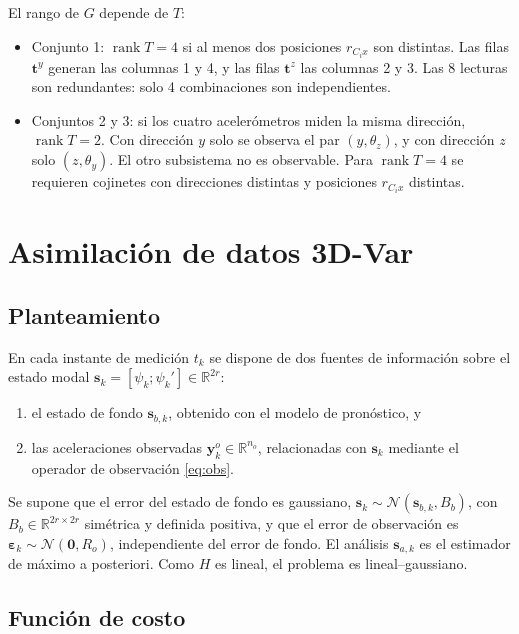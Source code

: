 El rango de $G$ depende de $T$:
\begin{itemize}
\item Conjunto 1: $\operatorname{rank}T=4$ si al menos dos posiciones $r_{C_ix}$ son distintas. Las filas $\mathbf t^y$ generan las columnas 1 y 4, y las filas $\mathbf t^z$ las columnas 2 y 3. Las 8 lecturas son redundantes: solo 4 combinaciones son independientes.
\item Conjuntos 2 y 3: si los cuatro acelerómetros miden la misma dirección, $\operatorname{rank}T=2$. Con dirección $y$ solo se observa el par $(y,\theta_z)$, y con dirección $z$ solo $(z,\theta_y)$. El otro subsistema no es observable. Para $\operatorname{rank}T=4$ se requieren cojinetes con direcciones distintas y posiciones $r_{C_ix}$ distintas.
\end{itemize}

\section{Asimilación de datos 3D-Var}

\subsection{Planteamiento}

En cada instante de medición $t_k$ se dispone de dos fuentes de información sobre el estado modal $\mathbf s_k=[\psi_k;\psi_k']\in\mathbb R^{2r}$:
\begin{enumerate}
\item el estado de fondo $\mathbf s_{b,k}$, obtenido con el modelo de pronóstico, y
\item las aceleraciones observadas $\mathbf y^o_k\in\mathbb R^{n_o}$, relacionadas con $\mathbf s_k$ mediante el operador de observación \eqref{eq:obs}.
\end{enumerate}
Se supone que el error del estado de fondo es gaussiano, $\mathbf s_k\sim\mathcal N(\mathbf s_{b,k},B_b)$, con $B_b\in\mathbb R^{2r\times2r}$ simétrica y definida positiva, y que el error de observación es $\boldsymbol\varepsilon_k\sim\mathcal N(\mathbf 0,R_o)$, independiente del error de fondo. El análisis $\mathbf s_{a,k}$ es el estimador de máximo a posteriori. Como $H$ es lineal, el problema es lineal--gaussiano.

\subsection{Función de costo}

